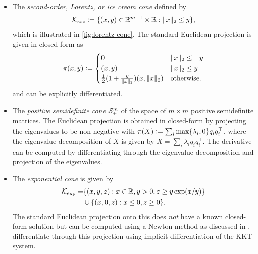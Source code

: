 \begin{itemize}
\item
  The \emph{second-order, Lorentz, or ice cream cone}
  defined by
  \begin{equation}
    {\mathcal{K}}_{\rm soc}\vcentcolon=\{(x,y)\in\mathbb{R}^{m-1}\times\mathbb{R} : \|x\|_2\leq y\},
    \label{eq:lorentz-cone}
  \end{equation}
  which is illustrated in \cref{fig:lorentz-cone}.
  The standard Euclidean projection is given in closed form as
  \begin{equation}
    \pi(x, y) \vcentcolon=
    \begin{cases}
      0 & \|x\|_2 \leq -y \\
      (x,y) & \|x\|_2 \leq y \\
      \frac{1}{2} (1 + \frac{y}{\|x\|_2}) (x, \|x\|_2) & \textrm{otherwise}.
    \end{cases}
  \end{equation}
  and can be explicitly differentiated.
\item The \emph{positive semidefinite cone} ${\mathcal{S}}^m_+$ of the
  space of $m\times m$ positive semidefinite matrices.
  The Euclidean projection is obtained in closed-form
  by projecting the eigenvalues to be non-negative with
  $\pi(X)\vcentcolon=\sum_i\max\{\lambda_i, 0\}q_iq_i^\top$,
  where the eigenvalue decomposition of $X$ is given by
  $X=\sum_i\lambda_iq_iq_i^\top$.
  The derivative can be computed by differentiating
  through the eigenvalue decomposition and projection
  of the eigenvalues.
\item The \emph{exponential cone} is given by
  \begin{equation}
  \begin{aligned}
    {\mathcal{K}}_{\rm exp} = & \{(x,y,z) : x\in\mathbb{R}, y>0, z\geq y\exp(x/y)\} \\
    & \cup \{(x,0,z): x\leq0, z\geq 0\}.
  \end{aligned}
  \label{eq:exp-cone}
  \end{equation}
  The standard Euclidean projection onto this does
  \emph{not} have a known closed-form solution
  but can be computed using a Newton method
  as discussed in
  \citet[\S6.3.4]{parikh2014proximal}.
  \citet{ali2017semismooth} differentiate through
  this projection using implicit differentiation
  of the KKT system.
\end{itemize}

